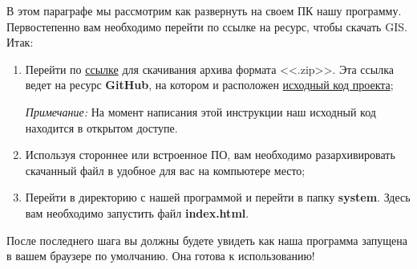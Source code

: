 %
В этом параграфе мы рассмотрим как развернуть на своем ПК нашу программу. Первостепенно вам необходимо перейти по ссылке на ресурс, чтобы скачать GIS. Итак:

\begin{enumerate}
	\item Перейти по \href{https://github.com/temikfart/GIS-Excelsior/archive/refs/heads/master.zip}{ссылке} для скачивания архива формата <<.zip>>. Эта ссылка ведет на ресурс \textbf{GitHub}, на котором и расположен \href{https://github.com/temikfart/GIS-Excelsior/tree/master}{исходный код проекта};
	
	\textit{Примечание:} На момент написания этой инструкции наш исходный код находится в открытом доступе.
	\item Используя стороннее или встроенное ПО, вам необходимо разархивировать скачанный файл в удобное для вас на компьютере место;
	\item Перейти в директорию с нашей программой и перейти в папку \textbf{system}. Здесь вам необходимо запустить файл \textbf{index.html}.
\end{enumerate}

После последнего шага вы должны будете увидеть как наша программа запущена в вашем браузере по умолчанию. Она готова к использованию!
%



%
